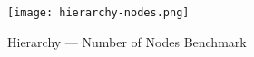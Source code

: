 \begin{figure}[H]
    \centering
    \texttt{[image: hierarchy-nodes.png]}
    \caption{Hierarchy --- Number of Nodes Benchmark}\label{fig:hierarchy_nodes_bm}
\end{figure}